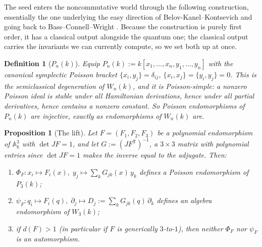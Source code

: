 \documentclass[11pt]{article}
\theoremstyle{change}
\newtheorem{definition}[equation]{Definition}
\newtheorem{prop}[equation]{Proposition}
\theoremstyle{nonumberplain}
\numberwithin{equation}{section}
\begin{document}
The seed enters the noncommutative world through the following construction, essentially the one underlying the easy direction of Belov-Kanel--Kontsevich and going back to Bass--Connell--Wright \cite{BCW}. Because the construction is purely first order, it has a classical output alongside the quantum one; the classical output carries the invariants we can currently compute, so we set both up at once.

\begin{definition}[$P_n(k)$]
Equip $P_n(k) := k[x_1, \dots, x_n, y_1, \dots, y_n]$ with the canonical symplectic Poisson bracket $\{x_i, y_j\} = \delta_{ij}$, $\{x_i,x_j\} = \{y_i,y_j\} = 0$. This is the semiclassical degeneration of $W_n(k)$, and it is Poisson-simple: a nonzero Poisson ideal is stable under all Hamiltonian derivations, hence under all partial derivatives, hence contains a nonzero constant. So Poisson endomorphisms of $P_n(k)$ are injective, exactly as endomorphisms of $W_n(k)$ are.
\end{definition}

\begin{prop}[The lift\label{lift}]
Let $F = (F_1, F_2, F_3)$ be a polynomial endomorphism of $\mathbb{A}^3_k$ with $\det JF = 1$, and let $G := (JF^{\mathsf{T}})^{-1}$, a $3\times 3$ matrix with polynomial entries since $\det JF = 1$ makes the inverse equal to the adjugate. Then:
\begin{enumerate}
\item $\Phi_F : x_i \mapsto F_i(x), \; y_j \mapsto \sum_k G_{jk}(x)\, y_k$ defines a Poisson endomorphism of $P_3(k)$;
\item $\psi_F : q_i \mapsto F_i(q), \; \partial_j \mapsto D_j := \sum_k G_{jk}(q)\, \partial_k$ defines an algebra endomorphism of $W_3(k)$;
\item if $d(F) > 1$ (in particular if $F$ is generically $3$-to-$1$), then neither $\Phi_F$ nor $\psi_F$ is an automorphism.
\end{enumerate}
\end{prop}
\end{document}
